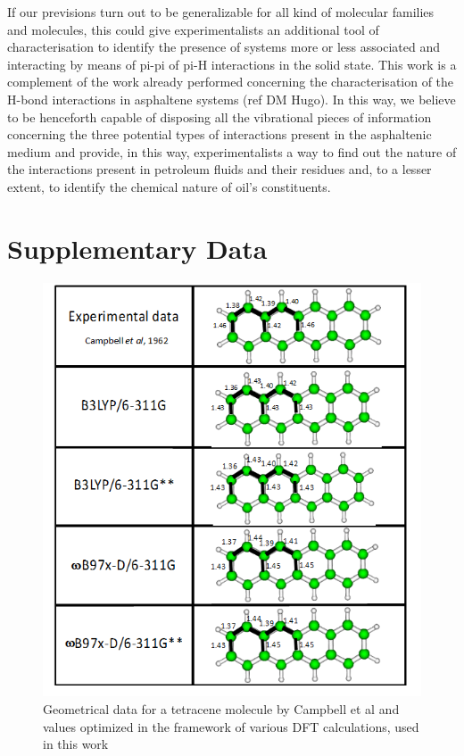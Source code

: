If our previsions turn out to be generalizable for all kind of molecular families and molecules, this could give experimentalists an additional tool of characterisation to identify the presence of systems more or less associated and interacting by means of pi-pi of pi-H interactions in the solid state. This work is a complement of the work already performed concerning the characterisation of the H-bond interactions in asphaltene systems (ref DM Hugo). In this way, we believe to be henceforth capable of disposing all the vibrational pieces of information concerning the three potential types of interactions present in the asphaltenic medium and provide, in this way, experimentalists a way to find out the nature of the interactions present in petroleum fluids and their residues and, to a lesser extent, to identify the chemical nature of oil’s constituents. 
 
 \newpage
 
 \section*{Supplementary Data}
 
 \begin{figure}[h]
 	\centering
 	\includegraphics[scale=0.8]{image/geometrical-data}
 	\caption[Geometrical data for a tetracene molecule]{Geometrical data for a tetracene molecule by Campbell et al \cite{campbell1962crystal} and values optimized in the framework of various DFT calculations, used in this work}
 \end{figure}
 
